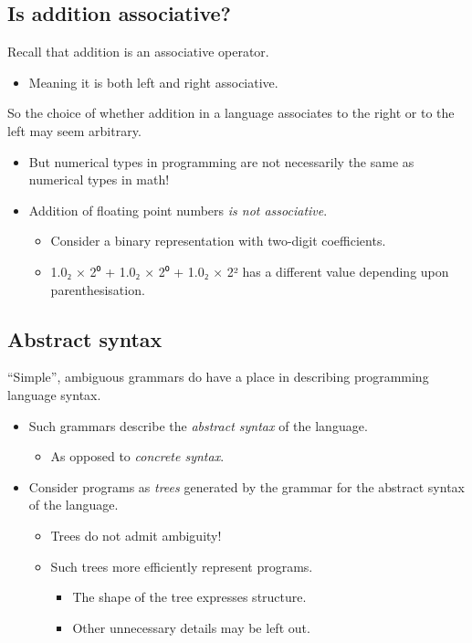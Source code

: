 \documentclass[11pt]{article}
\theoremstyle{definition}
\begin{document}
\subsection{Is addition associative?}
\label{sec:orga0a936d}

Recall that addition is an associative operator.
\begin{itemize}
\item Meaning it is both left and right associative.
\end{itemize}

So the choice of whether addition in a language associates to
the right or to the left may seem arbitrary.
\begin{itemize}
\item But numerical types in programming are not necessarily
the same as numerical types in math!
\item Addition of floating point numbers \emph{is not associative}.
\begin{itemize}
\item Consider a binary representation with two-digit coefficients.
\item 1.0₂ × 2⁰ + 1.0₂ × 2⁰ + 1.0₂ × 2² has a different value depending
upon parenthesisation.
\end{itemize}
\end{itemize}

\subsection{Abstract syntax}
\label{sec:orgb311e7a}

“Simple”, ambiguous grammars do have a place in describing
programming language syntax.
\begin{itemize}
\item Such grammars describe the \emph{abstract syntax} of the language.
\begin{itemize}
\item As opposed to \emph{concrete syntax}.
\end{itemize}
\item Consider programs as \emph{trees} generated by the grammar
for the abstract syntax of the language.
\begin{itemize}
\item Trees do not admit ambiguity!
\item Such trees more efficiently represent programs.
\begin{itemize}
\item The shape of the tree expresses structure.
\item Other unnecessary details may be left out.
\end{itemize}
\end{itemize}
\end{itemize}
\end{document}
